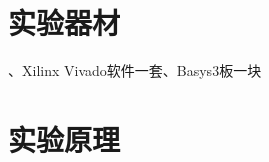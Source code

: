 \documentclass[12pt,UTF8]{ctexart}
\begin{document}
\begin{spacing}{1.1}
\section{实验器材}
、Xilinx Vivado软件一套、Basys3板一块

\section{实验原理}










\end{spacing}
\end{document}
